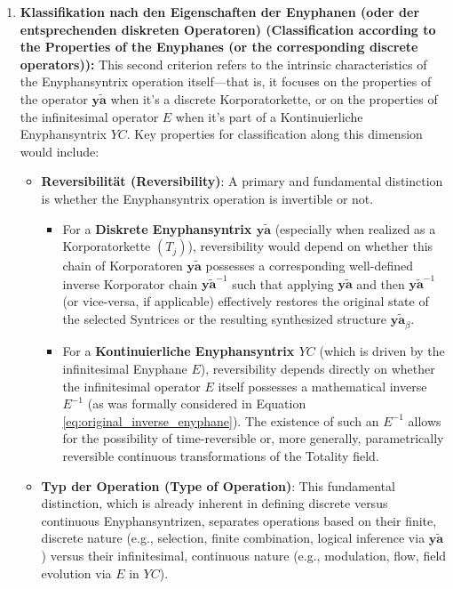 \documentclass[12pt]{article}
\newcommand{\diskreteEnyphansyntrix}{\bm{y\widetilde{a}}}
\newcommand{\kontinuierlicheEnyphansyntrix}{YC}
\newcommand{\enyphane}{E}
\begin{document}
\begin{enumerate}
    \item \textbf{Klassifikation nach den Eigenschaften der Enyphanen (oder der entsprechenden diskreten Operatoren) (Classification according to the Properties of the Enyphanes (or the corresponding discrete operators)):}
    This second criterion refers to the intrinsic characteristics of the Enyphansyntrix operation itself—that is, it focuses on the properties of the operator \( \diskreteEnyphansyntrix \) when it's a discrete Korporatorkette, or on the properties of the infinitesimal operator \( \enyphane \) when it's part of a Kontinuierliche Enyphansyntrix \( \kontinuierlicheEnyphansyntrix \). Key properties for classification along this dimension would include:
    \begin{itemize}
        \item \textbf{Reversibilität (Reversibility)}: A primary and fundamental distinction is whether the Enyphansyntrix operation is invertible or not.
        \begin{itemize}
            \item For a \textbf{Diskrete Enyphansyntrix \( \diskreteEnyphansyntrix \)} (especially when realized as a Korporatorkette \( (T_j) \)), reversibility would depend on whether this chain of Korporatoren \( \diskreteEnyphansyntrix \) possesses a corresponding well-defined inverse Korporator chain \( \diskreteEnyphansyntrix^{-1} \) such that applying \( \diskreteEnyphansyntrix \) and then \( \diskreteEnyphansyntrix^{-1} \) (or vice-versa, if applicable) effectively restores the original state of the selected Syntrices or the resulting synthesized structure \( \diskreteEnyphansyntrix_\beta \).
            \item For a \textbf{Kontinuierliche Enyphansyntrix \( \kontinuierlicheEnyphansyntrix \)} (which is driven by the infinitesimal Enyphane \( \enyphane \)), reversibility depends directly on whether the infinitesimal operator \( \enyphane \) itself possesses a mathematical inverse \( \enyphane^{-1} \) (as was formally considered in Equation \eqref{eq:original_inverse_enyphane}). The existence of such an \( \enyphane^{-1} \) allows for the possibility of time-reversible or, more generally, parametrically reversible continuous transformations of the Totality field.
        \end{itemize}
        \item \textbf{Typ der Operation (Type of Operation)}: This fundamental distinction, which is already inherent in defining discrete versus continuous Enyphansyntrizen, separates operations based on their finite, discrete nature (e.g., selection, finite combination, logical inference via \( \diskreteEnyphansyntrix \)) versus their infinitesimal, continuous nature (e.g., modulation, flow, field evolution via \( \enyphane \) in \( \kontinuierlicheEnyphansyntrix \)).

\end{itemize}
\end{enumerate}
\end{document}
